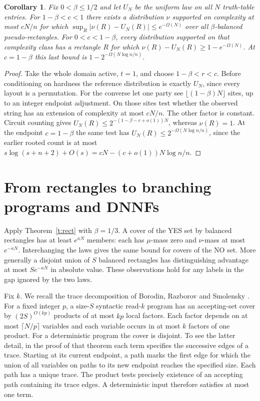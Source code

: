 \documentclass[11pt]{article}
\newtheorem{corollary}[theorem]{Corollary}
\begin{document}
\begin{corollary}\label{c:uniform}
Fix $0<\beta\le1/2$ and let $U_N$ be the uniform law on all $N$ truth-table entries. For $1-\beta<c<1$ there exists a distribution $\nu$ supported on complexity at most $cN/n$ for which $\sup_R|\nu(R)-U_N(R)|\le e^{-\Omega(N)}$ over all $\beta$-balanced pseudo-rectangles. For $0<c<1-\beta$, every distribution supported on that complexity class has a rectangle $R$ for which $\nu(R)-U_N(R)\ge1-e^{-\Omega(N)}$. At $c=1-\beta$ this last bound is $1-2^{-\Omega(N\log n/n)}$.
\end{corollary}
\begin{proof}
Take the whole domain active, $t=1$, and choose $1-\beta<r<c$. Before conditioning on hardness the reference distribution is exactly $U_N$, since every layout is a permutation. For the converse let one party see $\lfloor(1-\beta)N\rfloor$ sites, up to an integer endpoint adjustment. On those sites test whether the observed string has an extension of complexity at most $cN/n$. The other factor is constant. Circuit counting gives $U_N(R)\le2^{-(1-\beta-c+o(1))N}$, whereas $\nu(R)=1$. At the endpoint $c=1-\beta$ the same test has $U_N(R)\le2^{-\Omega(N\log n/n)}$, since the earlier rooted count is at most $s\log(s+n+2)+O(s)=cN-(c+o(1))N\log n/n$.
\end{proof}

\section{From rectangles to branching programs and DNNFs}

Apply Theorem~\ref{t:rect} with $\beta=1/3$. A cover of the YES set by balanced rectangles has at least $e^{\kappa N}$ members: each has $\mu$-mass zero and $\nu$-mass at most $e^{-\kappa N}$. Interchanging the laws gives the same bound for covers of the NO set. More generally a disjoint union of $S$ balanced rectangles has distinguishing advantage at most $S e^{-\kappa N}$ in absolute value. These observations hold for any labels in the gap ignored by the two laws.

Fix $k$. We recall the trace decomposition of Borodin, Razborov and Smolensky \cite[Theorem~1]{brs}. For a fixed integer $p$, a size-$S$ syntactic read-$k$ program has an accepting-set cover by $(2S)^{O(kp)}$ products of at most $kp$ local factors. Each factor depends on at most $\lceil N/p\rceil$ variables and each variable occurs in at most $k$ factors of one product. For a deterministic program the cover is disjoint. To see the latter detail, in the proof of that theorem each term specifies the successive edges of a trace. Starting at its current endpoint, a path marks the first edge for which the union of all variables on paths to its new endpoint reaches the specified size. Each path has a unique trace. The product tests precisely existence of an accepting path containing its trace edges. A deterministic input therefore satisfies at most one term.
\end{document}
